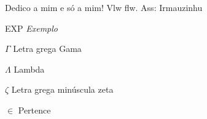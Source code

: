 \documentclass[12pt,
				openright,
				twoside,
				a4paper,
				apter=TITLE,
				section=TITLE,
				subsection=TITLE,
				chapter=TITLE,
				english,
				french,
				spanish,
				brazil]{abntex2}
\begin{document}

\begin{flushright}
\begin{minipage}[b]{13cm}
\vspace{20.01cm}

\calligra Dedico a mim e só a mim! Vlw flw. 
Ass: Irmauzinhu

\end{minipage}
\end{flushright}
\clearpage

\listoffigures*
\cleardoublepage

\listoftables*
\cleardoublepage

\begin{siglas}
\item EXP \textit{Exemplo} 

\end{siglas}

\begin{simbolos}
  \item[$ \Gamma $] Letra grega Gama
  \item[$ \Lambda $] Lambda
  \item[$ \zeta $] Letra grega minúscula zeta
  \item[$ \in $] Pertence
\end{simbolos}

\tableofcontents*
\cleardoublepage


\textual


\frenchspacing 

\end{document}
